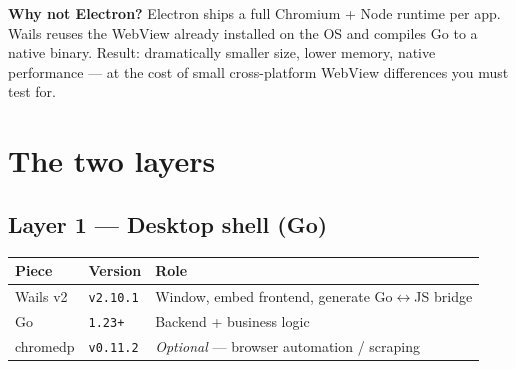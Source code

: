 \documentclass[11pt,a4paper]{article}
\begin{document}
\begin{callout}
\textbf{Why not Electron?} Electron ships a full Chromium + Node runtime per app.
Wails reuses the WebView already installed on the OS and compiles Go to a native
binary. Result: dramatically smaller size, lower memory, native performance ---
at the cost of small cross-platform WebView differences you must test for.
\end{callout}

\section{The two layers}

\subsection{Layer 1 --- Desktop shell (Go)}
\begin{center}
\begin{tabularx}{\linewidth}{@{}l l X@{}}
\toprule
\textbf{Piece} & \textbf{Version} & \textbf{Role} \\
\midrule
Wails v2   & \texttt{v2.10.1} & Window, embed frontend, generate Go$\leftrightarrow$JS bridge \\
Go         & \texttt{1.23+}   & Backend + business logic \\
chromedp   & \texttt{v0.11.2} & \emph{Optional} --- browser automation / scraping \\
\bottomrule
\end{tabularx}
\end{center}
\end{document}

